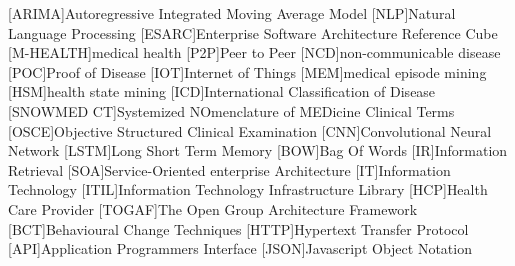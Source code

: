 \begin{acronym}[SNOWMED CT]
[ARIMA]{Autoregressive Integrated Moving Average Model}
[NLP]{Natural Language Processing}
[ESARC]{Enterprise Software Architecture Reference Cube}
[M-HEALTH]{medical health}
[P2P]{Peer to Peer}
[NCD]{non-communicable disease}
[POC]{Proof of Disease}
[IOT]{Internet of Things}
[MEM]{medical episode mining}
[HSM]{health state mining}
[ICD]{International Classification of Disease}
[SNOWMED CT]{Systemized NOmenclature of MEDicine Clinical Terms}
[OSCE]{Objective Structured Clinical Examination}
[CNN]{Convolutional Neural Network}
[LSTM]{Long Short Term Memory}
[BOW]{Bag Of Words}
[IR]{Information Retrieval}
[SOA]{Service-Oriented enterprise Architecture}
[IT]{Information Technology}
[ITIL]{Information Technology Infrastructure Library}
[HCP]{Health Care Provider}
[TOGAF]{The Open Group Architecture Framework}
[BCT]{Behavioural Change Techniques}
[HTTP]{Hypertext Transfer Protocol}
[API]{Application Programmers Interface}
[JSON]{Javascript Object Notation}
\end{acronym}